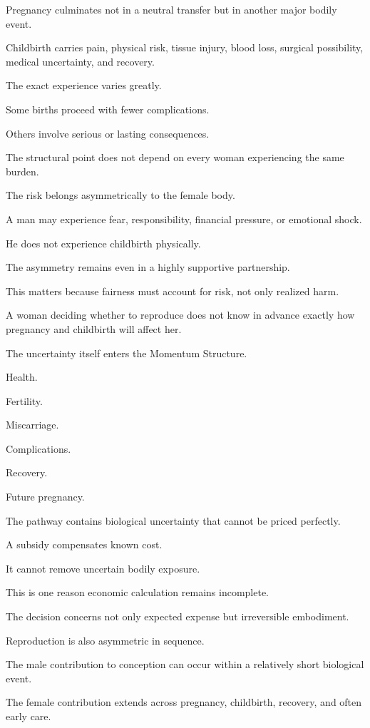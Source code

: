 Pregnancy culminates not in a neutral transfer but in another major bodily event.

Childbirth carries pain, physical risk, tissue injury, blood loss, surgical possibility, medical uncertainty, and recovery.

The exact experience varies greatly.

Some births proceed with fewer complications.

Others involve serious or lasting consequences.

The structural point does not depend on every woman experiencing the same burden.

The risk belongs asymmetrically to the female body.

A man may experience fear, responsibility, financial pressure, or emotional shock.

He does not experience childbirth physically.

The asymmetry remains even in a highly supportive partnership.

This matters because fairness must account for risk, not only realized harm.

A woman deciding whether to reproduce does not know in advance exactly how pregnancy and childbirth will affect her.

The uncertainty itself enters the Momentum Structure.

Health.

Fertility.

Miscarriage.

Complications.

Recovery.

Future pregnancy.

The pathway contains biological uncertainty that cannot be priced perfectly.

A subsidy compensates known cost.

It cannot remove uncertain bodily exposure.

This is one reason economic calculation remains incomplete.

The decision concerns not only expected expense but irreversible embodiment.

Reproduction is also asymmetric in sequence.

The male contribution to conception can occur within a relatively short biological event.

The female contribution extends across pregnancy, childbirth, recovery, and often early care.

